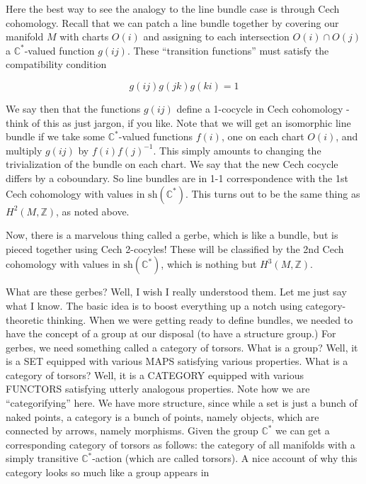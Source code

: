 \documentclass{article}
\def\tightlist{}
\renewcommand{\texttt}[1]{%
  \begingroup
  \ttfamily
  \begingroup\lccode`~=`/\lowercase{\endgroup\def~}{/\discretionary{}{}{}}%
  \begingroup\lccode`~=`[\lowercase{\endgroup\def~}{[\discretionary{}{}{}}%
  \begingroup\lccode`~=`.\lowercase{\endgroup\def~}{.\discretionary{}{}{}}%
  \catcode`/=\active\catcode`[=\active\catcode`.=\active
  \scantokens{#1\noexpand}%
  \endgroup
}
\begin{document}
Here the best way to see the analogy to the line bundle case is through
Cech cohomology. Recall that we can patch a line bundle together by
covering our manifold \(M\) with charts \(O(i)\) and assigning to each
intersection \(O(i) \cap O(j)\) a \(\mathbb{C}^*\)-valued function
\(g(ij)\). These ``transition functions'' must satisfy the compatibility
condition

\[g(ij) g(jk) g(ki) = 1\]

We say then that the functions \(g(ij)\) define a 1-cocycle in Cech
cohomology - think of this as just jargon, if you like. Note that we
will get an isomorphic line bundle if we take some
\(\mathbb{C}^*\)-valued functions \(f(i)\), one on each chart \(O(i)\),
and multiply \(g(ij)\) by \(f(i)f(j)^{-1}\). This simply amounts to
changing the trivialization of the bundle on each chart. We say that the
new Cech cocycle differs by a coboundary. So line bundles are in 1-1
correspondence with the 1st Cech cohomology with values in
\(\mathrm{sh}(\mathbb{C}^*)\). This turns out to be the same thing as
\(H^2(M,\mathbb{Z})\), as noted above.

Now, there is a marvelous thing called a gerbe, which is like a bundle,
but is pieced together using Cech 2-cocyles! These will be classified by
the 2nd Cech cohomology with values in \(\mathrm{sh}(\mathbb{C}^*)\),
which is nothing but \(H^3(M,\mathbb{Z})\).

What are these gerbes? Well, I wish I really understood them. Let me
just say what I know. The basic idea is to boost everything up a notch
using category-theoretic thinking. When we were getting ready to define
bundles, we needed to have the concept of a group at our disposal (to
have a structure group.) For gerbes, we need something called a category
of torsors. What is a group? Well, it is a SET equipped with various
MAPS satisfying various properties. What is a category of torsors? Well,
it is a CATEGORY equipped with various FUNCTORS satisfying utterly
analogous properties. Note how we are ``categorifying'' here. We have
more structure, since while a set is just a bunch of naked points, a
category is a bunch of points, namely objects, which are connected by
arrows, namely morphisms. Given the group \(\mathbb{C}^*\) we can get a
corresponding category of torsors as follows: the category of all
manifolds with a simply transitive \(\mathbb{C}^*\)-action (which are
called torsors). A nice account of why this category looks so much like
a group appears in

\end{document}
